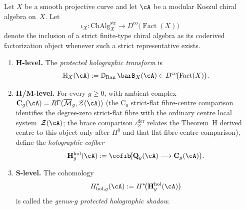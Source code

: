 \begin{definition}
\label{def:frontier-protected-holographic-transform}
Let $X$ be a smooth projective curve and let $\cA$ be a modular Koszul chiral
algebra on~$X$.
Let
\[
\iota_X\colon \mathrm{ChAlg}^{\mathrm{str}}_X
\longrightarrow D^{\mathrm{co}}\!\bigl(\operatorname{Fact}(X)\bigr)
\]
denote the inclusion of a strict finite-type chiral algebra as its
coderived factorization object whenever such a strict representative
exists.
\begin{enumerate}[label=\textup{(\roman*)}]
\item \textbf{H-level.}
 The \emph{protected holographic transform} is
 \begin{equation}\label{eq:frontier-protected-holographic-transform}
 \mathbb H_X(\cA)
 :=
 \mathbb D_{\operatorname{Ran}}\,\barB_X(\cA)
 \in D^{\mathrm{co}}\!\bigl(\operatorname{Fact}(X)\bigr).
 \end{equation}
\item \textbf{H/M-level.}
 For every $g\ge 0$, with ambient complex
 $\mathbf C_g(\cA)=R\Gamma(\overline{\mathcal M}_g,\mathcal Z(\cA))$
 \textup{(}the $\mathrm C_0$ strict-flat fibre-centre comparison
 identifies the degree-zero strict-flat fibre with the ordinary
 centre local system~$\mathcal Z(\cA)$; the brace comparison
 $\iota_Z^{\mathrm{der}}$ relates the Theorem~H derived centre to
 this object only after $H^0$ and that flat fibre-centre
 comparison\textup{)}, define
 the \emph{holographic cofiber}
 \begin{equation}\label{eq:frontier-holographic-cofiber}
 \mathbf H^{\mathrm{hol}}_g(\cA)
 :=
 \cofib\!\bigl(\mathbf Q_g(\cA)\longrightarrow \mathbf C_g(\cA)\bigr).
 \end{equation}
\item \textbf{S-level.}
 The cohomology
 \begin{equation}\label{eq:frontier-holographic-shadow}
 H^*_{\mathrm{hol},g}(\cA):=H^*\!\bigl(\mathbf H^{\mathrm{hol}}_g(\cA)\bigr)
 \end{equation}
 is called the \emph{genus-$g$ protected holographic shadow}.
\end{enumerate}
\end{definition}

